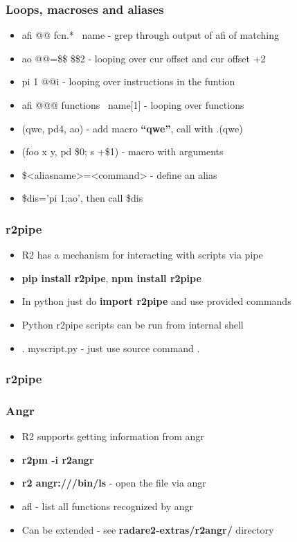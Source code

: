 \documentclass[10pt,pdf,utf8,english,compress,hyperref={unicode}]{beamer}
\begin{document}
\begin{frame}[fragile]
  \frametitle{Loops, macroses and aliases}
  \begin{itemize}
	  \item \alert{afi @@ fcn.* ~name} - grep through output of afi of matching
	  \item \alert{ao @@=\$\$ \$\$2} - looping over cur offset and cur offset +2
	  \item \alert{pi 1 @@i} - looping over instructions in the funtion
	  \item \alert{afi @@@ functions ~name[1]} - looping over functions
	  \item \alert{(qwe, pd4, ao)} - add macro \textbf{``qwe''}, call with \alert{.(qwe)}
	  \item \alert{(foo x y, pd \$0; s +\$1)} - macro with arguments
	  \item \alert{\$<aliasname>=<command>} - define an alias
	  \item \alert{\$dis='pi 1;ao'}, then call \alert{\$dis}
  \end{itemize}
\end{frame}

\begin{frame}[fragile]
  \frametitle{r2pipe}
  \begin{itemize}
	  \item R2 has a mechanism for interacting with scripts via pipe
	  \item \textbf{pip install r2pipe}, \textbf{npm install r2pipe}
	  \item In python just do \textbf{import r2pipe} and use provided commands
	  \item Python r2pipe scripts can be run from internal shell
	  \item \alert{. myscript.py} - just use source command \alert{.}
  \end{itemize}
\end{frame}

\begin{frame}[fragile]
  \frametitle{r2pipe}
	
\end{frame}

\begin{frame}[fragile]
  \frametitle{Angr}
  \begin{itemize}
	  \item R2 supports getting information from angr
	  \item \textbf{r2pm -i r2angr}
	  \item \textbf{r2 angr:///bin/ls} - open the file via angr
	  \item \alert{afl} - list all functions recognized by angr
	  \item Can be extended - see \textbf{radare2-extras/r2angr/} directory
  \end{itemize}
\end{frame}
\end{document}
